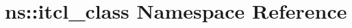 \hypertarget{namespacens_1_1itcl__class}{}\section{ns\+:\+:itcl\+\_\+class Namespace Reference}
\label{namespacens_1_1itcl__class}
